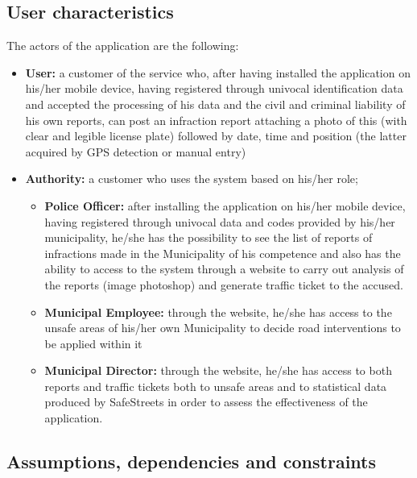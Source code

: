 \documentclass{article}
\begin{document}
\subsection{User characteristics}
The actors of the application are the following:
\begin{itemize}
    \item \textbf{User:} a customer of the service who, after having installed
    the application on his/her mobile device, having registered through univocal
    identification data and accepted the processing of his data and the civil
    and criminal liability of his own reports, can post an infraction report
    attaching a photo of this (with clear and legible license plate) followed by
    date, time and position (the latter acquired by GPS detection or manual
    entry)
    \item \textbf{Authority:} a customer who uses the system based on his/her
    role;
    \begin{itemize}
        \item \textbf{Police Officer:} after installing the application on
        his/her mobile device, having registered through univocal data and codes
        provided by his/her municipality, he/she has the possibility to see the
        list of reports of infractions made in the Municipality of his
        competence and also has the ability to access to the system through a
        website to carry out analysis of the reports (image photoshop) and
        generate traffic ticket to the accused.
        \item \textbf{Municipal Employee:} through the website, he/she has
        access to the unsafe areas of his/her own Municipality to decide road
        interventions to be applied within it
        \item \textbf{Municipal Director:} through the website, he/she has
        access to both reports and traffic tickets both to unsafe areas and to
        statistical data produced by SafeStreets in order to assess the
        effectiveness of the application.
    \end{itemize}
\end{itemize}
\subsection{Assumptions, dependencies and constraints}
\end{document}
